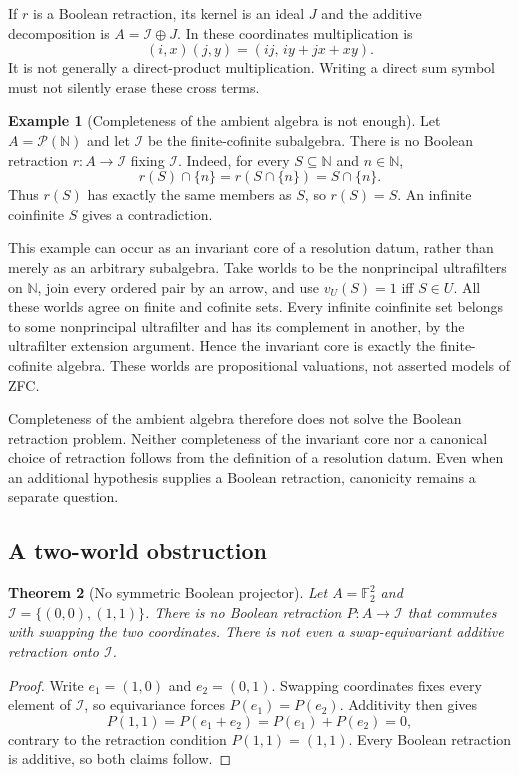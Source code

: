 \documentclass[11pt,letterpaper]{article}
\newtheorem{theorem}{Theorem}[section]
\theoremstyle{definition}
\newtheorem{example}[theorem]{Example}
\newcommand{\F}{\mathbb F_2}
\newcommand{\Pow}{\mathcal P}
\newcommand{\Inv}{\mathcal I}
\begin{document}
If $r$ is a Boolean retraction, its kernel is an ideal $J$ and the additive decomposition is $A=\Inv\oplus J$. In these coordinates multiplication is
\[
(i,x)(j,y)=(ij,\,iy+jx+xy).
\]
It is not generally a direct-product multiplication. Writing a direct sum symbol must not silently erase these cross terms.

\begin{example}[Completeness of the ambient algebra is not enough]\label{ex:noretraction}
Let $A=\Pow(\mathbb N)$ and let $\Inv$ be the finite-cofinite subalgebra. There is no Boolean retraction $r:A\to\Inv$ fixing $\Inv$.
Indeed, for every $S\subseteq\mathbb N$ and $n\in\mathbb N$,
\[
r(S)\cap\{n\}=r(S\cap\{n\})=S\cap\{n\}.
\]
Thus $r(S)$ has exactly the same members as $S$, so $r(S)=S$. An infinite coinfinite $S$ gives a contradiction.
\end{example}

This example can occur as an invariant core of a resolution datum, rather than merely as an arbitrary subalgebra. Take worlds to be the nonprincipal ultrafilters on $\mathbb N$, join every ordered pair by an arrow, and use $v_U(S)=1$ iff $S\in U$. All these worlds agree on finite and cofinite sets. Every infinite coinfinite set belongs to some nonprincipal ultrafilter and has its complement in another, by the ultrafilter extension argument. Hence the invariant core is exactly the finite-cofinite algebra. These worlds are propositional valuations, not asserted models of ZFC.

Completeness of the ambient algebra therefore does not solve the Boolean retraction problem. Neither completeness of the invariant core nor a canonical choice of retraction follows from the definition of a resolution datum. Even when an additional hypothesis supplies a Boolean retraction, canonicity remains a separate question.

\subsection{A two-world obstruction}
\begin{theorem}[No symmetric Boolean projector]\label{thm:nocanonical}
Let $A=\F^2$ and $\Inv=\{(0,0),(1,1)\}$. There is no Boolean retraction $P:A\to\Inv$ that commutes with swapping the two coordinates. There is not even a swap-equivariant additive retraction onto $\Inv$.
\end{theorem}
\begin{proof}
Write $e_1=(1,0)$ and $e_2=(0,1)$. Swapping coordinates fixes every element of $\Inv$, so equivariance forces $P(e_1)=P(e_2)$. Additivity then gives
\[
P(1,1)=P(e_1+e_2)=P(e_1)+P(e_2)=0,
\]
contrary to the retraction condition $P(1,1)=(1,1)$. Every Boolean retraction is additive, so both claims follow.
\end{proof}
\end{document}
